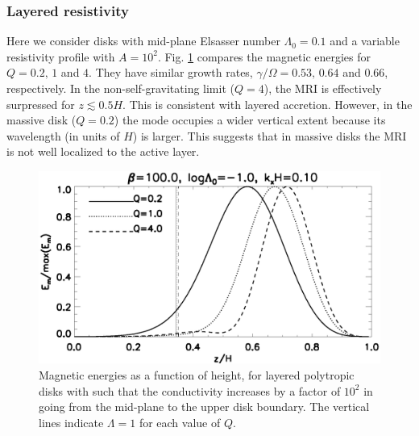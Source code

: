 \subsubsection{Layered 
  resistivity} 
Here we consider disks with mid-plane Elsasser number $\Lambda_0=0.1$
and a variable resistivity profile with
$A=10^2$. Fig. \ref{poly_layer} compares the magnetic  
energies for $Q=0.2,\,1$ and $4$. They have similar growth rates, $\gamma/\Omega
= 0.53,\,0.64$ and $0.66$, respectively. In the non-self-gravitating
limit ($Q=4$), the MRI is effectively surpressed for
$z\lesssim0.5H$. This is consistent with layered accretion. However,
in the massive disk ($Q=0.2$) the mode occupies a wider vertical
extent because its wavelength (in units of $H$) is larger. This
suggests that in massive disks the MRI is not well localized to the
active layer. 


\begin{figure}
  \includegraphics[width=\linewidth]{figures/compare_results_poly_layer_amp100}
  \caption{Magnetic energies as a function of height, for layered polytropic disks with
    such that the conductivity increases by a 
    factor of $10^2$ in going from the mid-plane to the upper disk
    boundary. The vertical lines indicate $\Lambda=1$ for each value
    of $Q$.
    \label{poly_layer}}
\end{figure}


